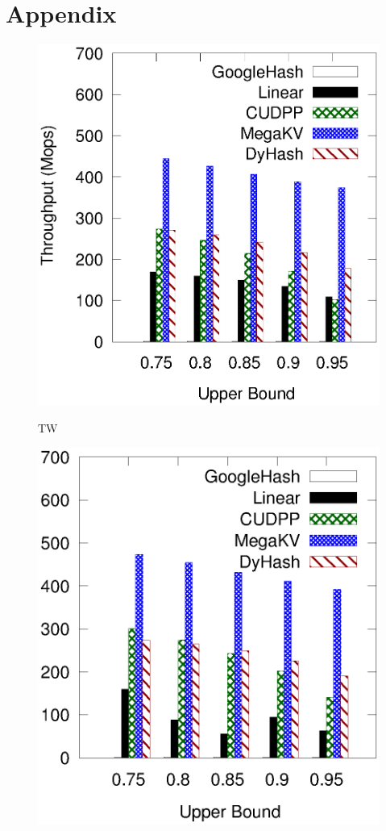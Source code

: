 

\section*{Appendix}

\begin{figure}[t]
	\begin{minipage}{0.19\linewidth}\centering
		\includegraphics[width=\linewidth]{pic/static-upper/upper_insert_twitter.eps}
		\centerline{TW}
	\end{minipage}
	\hfill
	\begin{minipage}{0.19\linewidth}\centering
		\includegraphics[width=\linewidth]{pic/static-upper/upper_insert_reddit.eps}

\end{minipage}
\end{figure}
